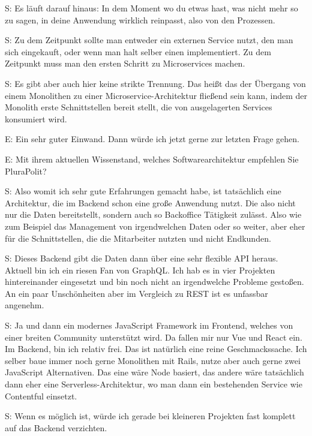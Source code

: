  \label{appendix:s-28}
S: Es läuft darauf hinaus: In dem Moment wo du etwas hast, was nicht mehr so zu sagen, in deine Anwendung wirklich reinpasst, also von den Prozessen.

 \label{appendix:s-29}
S: Zu dem Zeitpunkt sollte man entweder ein externen Service nutzt, den man sich eingekauft, oder wenn man halt selber einen implementiert. Zu dem Zeitpunkt muss man den ersten Schritt zu Microservices machen. 

 \label{appendix:s-30}
S: Es gibt aber auch hier keine strikte Trennung. Das heißt das der Übergang von einem Monolithen zu einer Microservice-Architektur fließend sein kann, indem der Monolith erste Schnittstellen bereit stellt, die von ausgelagerten Services konsumiert wird.


E: Ein sehr guter Einwand. Dann würde ich jetzt gerne zur letzten Frage gehen.

E: Mit ihrem aktuellen Wissenstand, welches Softwarearchitektur empfehlen Sie PluraPolit?

 \label{appendix:s-31}
S:  Also womit ich sehr gute Erfahrungen gemacht habe, ist tatsächlich eine Architektur, die im Backend schon eine große Anwendung nutzt. Die also nicht nur die Daten bereitstellt, sondern auch so Backoffice Tätigkeit zulässt. Also wie zum Beispiel das Management von irgendwelchen Daten oder so weiter, aber eher für die Schnittstellen, die die Mitarbeiter nutzten und nicht Endkunden.

 \label{appendix:s-32}
S: Dieses Backend gibt die Daten dann über eine sehr flexible API heraus. Aktuell bin ich ein riesen Fan von GraphQL. Ich hab es in vier Projekten hintereinander eingesetzt und bin noch nicht an irgendwelche Probleme gestoßen. An ein paar Unschönheiten aber im Vergleich zu REST ist es unfassbar angenehm. 

 \label{appendix:s-33}
S: Ja und dann ein modernes JavaScript Framework im Frontend, welches von einer breiten Community unterstützt wird. Da fallen mir nur Vue und React ein. Im Backend, bin ich relativ frei. Das ist natürlich eine reine Geschmackssache. Ich selber baue immer noch gerne Monolithen mit Rails, nutze aber auch gerne zwei JavaScript Alternativen. Das eine wäre Node basiert, das andere wäre tatsächlich dann eher eine Serverless-Architektur, wo man dann ein bestehenden Service wie Contentful einsetzt. 

 \label{appendix:s-34}
S: Wenn es möglich ist, würde ich gerade bei kleineren Projekten fast komplett auf das Backend verzichten.


